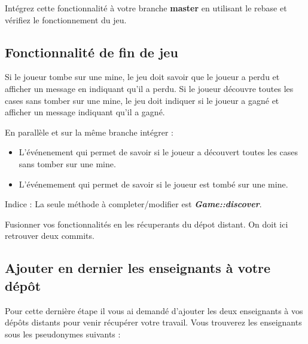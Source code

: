 \medskip

Intégrez cette fonctionnalité à votre branche \textbf{master} en utilisant le rebase et vérifiez le fonctionnement du jeu.

\subsection{Fonctionnalité de fin de jeu}
\noindent Si le joueur tombe sur une mine, le jeu doit savoir que le joueur a perdu et afficher un message en indiquant qu'il a perdu. Si le joueur découvre toutes les cases sans tomber sur une mine, le jeu doit indiquer si le joueur a gagné et afficher un message indiquant qu'il a gagné.

\medskip

\noindent En parallèle et sur la même branche intégrer : 
\begin{itemize}
    \item L'événenement qui permet de savoir si le joueur a découvert toutes les cases sans tomber sur une mine.
    \item L'événemement qui permet de savoir si le joueur est tombé sur une mine.
\end{itemize}

\medskip

Indice : La seule méthode à completer/modifier est \textit{\textbf{Game::discover}}.

\medskip

Fusionner vos fonctionnalités en les récuperants du dépot distant. On doit ici retrouver deux commits.

\subsection{Ajouter en dernier les enseignants à votre dépôt}

\noindent Pour cette dernière étape il vous ai demandé d'ajouter les deux enseignants à vos dépôts distants pour venir récupérer votre travail. Vous trouverez les enseignants sous les pseudonymes suivants :

